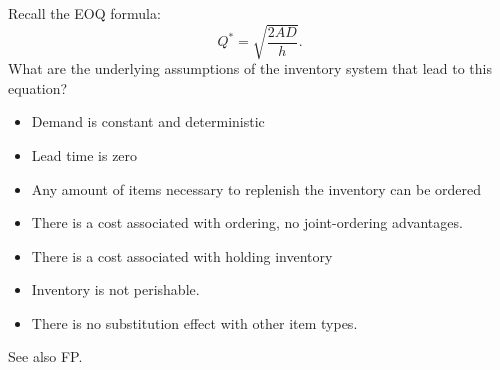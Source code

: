 \begin{question}\label{ex:1}
  Recall the EOQ formula:
  \begin{equation*}
    Q^* = \sqrt{\frac{ 2 A D}{h}}.
  \end{equation*}
What are the underlying assumptions of the inventory system that lead to this equation?
\begin{solution}
\begin{itemize}
\item Demand is constant and deterministic
\item Lead time is zero
\item Any amount of items necessary to replenish the inventory can be
  ordered
\item There is a cost associated with ordering, no joint-ordering advantages.
\item There is a cost associated with holding inventory
\item Inventory is not perishable.
\item There is no substitution effect with other item types.
\end{itemize}
See also FP.
\end{solution}
\end{question}


